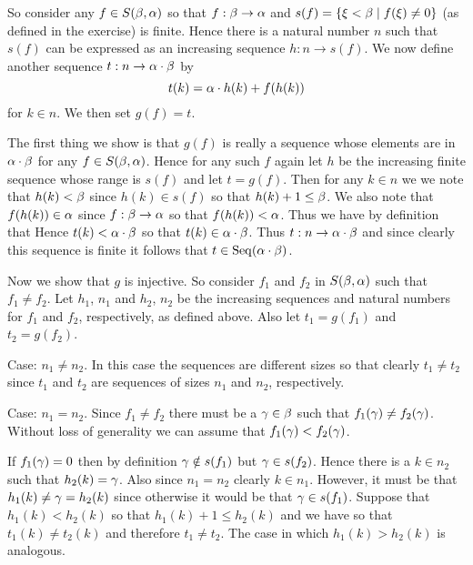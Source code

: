 {{    So consider any $f \in S(\beta, \alpha)$ so that $f:\beta \to \alpha$ and $s(f) = \left\{ \xi < \beta \mid f(\xi) \neq 0 \right\}$ (as defined in the exercise) is finite.
    Hence there is a natural number $n$ such that $s(f)$ can be expressed as an increasing sequence $h: n \to s(f)$.
    We now define another sequence $t: n \to \alpha \cdot \beta$ by
    $$
      t(k) = \alpha \cdot h(k) + f(h(k))
    $$
    for $k \in n$.
    We then set $g(f) = t$.

    The first thing we show is that $g(f)$ is really a sequence whose elements are in $\alpha \cdot \beta$ for any $f \in S(\beta, \alpha)$.
    Hence for any such $f$ again let $h$ be the increasing finite sequence whose range is $s(f)$ and let $t = g(f)$.
    Then for any $k \in n$ we we note that $h(k) < \beta$ since $h(k) \in s(f)$ so that $h(k) + 1 \leq \beta$.
    We also note that $f(h(k)) \in \alpha$ since $f: \beta \to \alpha$ so that $f(h(k)) < \alpha$.
    Thus we have by definition that
    Hence $t(k) < \alpha \cdot \beta$ so that $t(k) \in \alpha \cdot \beta$.
    Thus $t: n \to \alpha \cdot \beta$ and since clearly this sequence is finite it follows that $t \in \mathrm{Seq}(\alpha \cdot \beta)$.

    Now we show that $g$ is injective.
    So consider $f_1$ and $f_2$ in $S(\beta, \alpha)$ such that $f_1 \neq f_2$.
    Let $h_1$, $n_1$ and $h_2$, $n_2$ be the increasing sequences and natural numbers for $f_1$ and $f_2$, respectively, as defined above.
    Also let $t_1 = g(f_1)$ and $t_2 = g(f_2)$.

    Case: $n_1 \neq n_2$.
    In this case the sequences are different sizes so that clearly $t_1 \neq t_2$ since $t_1$ and $t_2$ are sequences of sizes $n_1$ and $n_2$, respectively.

    Case: $n_1 = n_2$.
    Since $f_1 \neq f_2$ there must be a $\gamma \in \beta$ such that $f_1(\gamma) \neq f_2(\gamma)$.
    Without loss of generality we can assume that $f_1(\gamma) < f_2(\gamma)$.

    If $f_1(\gamma) = 0$ then by definition $\gamma \notin s(f_1)$ but $\gamma \in s(f_2)$.
    Hence there is a $k \in n_2$ such that $h_2(k) = \gamma$.
    Also since $n_1 = n_2$ clearly $k \in n_1$.
    However, it must be that $h_1(k) \neq \gamma = h_2(k)$ since otherwise it would be that $\gamma \in s(f_1)$.
    Suppose that $h_1(k) < h_2(k)$ so that $h_1(k) + 1 \leq h_2(k)$ and we have
    so that $t_1(k) \neq t_2(k)$ and therefore $t_1 \neq t_2$.
    The case in which $h_1(k) > h_2(k)$ is analogous.

}}
